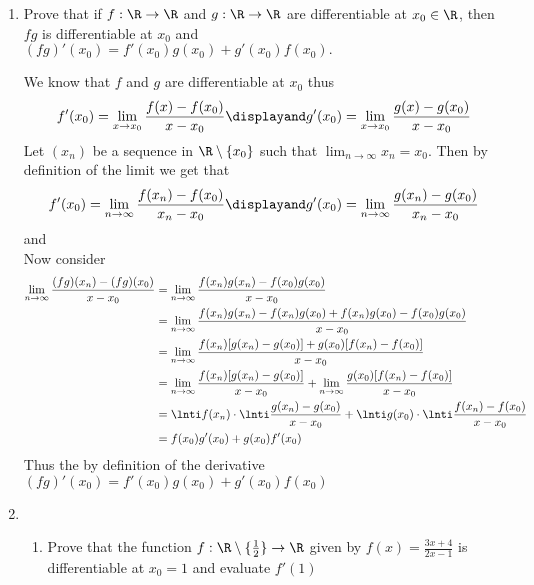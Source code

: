 \documentclass[11pt]{exam}
\begin{document}
    \begin{enumerate}
        \item Prove that if $f: \R \to \R$ and $g: \R \to \R$ are differentiable at $x_0 \in \R$, then 
        $fg$ is differentiable at $x_0$ and $(fg)'(x_0) = f'(x_0)g(x_0) + g'(x_0)f(x_0).$
            \begin{solution}
                We know that $f$ and $g$ are differentiable at $x_0$ thus 
                $$f'(x_0)  = \lim_{x \to x_0} \frac{f(x) - f(x_0)}{x - x_0} 
                \displayand g'(x_0)  = \lim_{x \to x_0} \frac{g(x) - g(x_0)}{x - x_0}$$
                Let $(x_n)$ be a sequence in $\R \setminus \{x_0\}$ such that $\lim_{n \to \infty} x_n = x_0$. Then by definition of the limit 
                we get that 
                $$f'(x_0) = \lim_{n \to \infty} \frac{f(x_n) - f(x_0)}{x_n - x_0} \displayand g'(x_0) = \lim_{n \to \infty} \frac{g(x_n) - g(x_0)}{x_n - x_0} $$ and 
                $$$$
                Now consider 
                \begin{align*}
                    \lim_{n \to \infty} \frac{(fg)(x_n) - (fg)(x_0)}{x - x_0} 
                    &= \lim_{n \to \infty} \frac{f(x_n)g(x_n) - f(x_0)g(x_0)}{x-x_0}  \\
                    &= \lim_{n \to \infty} \frac{f(x_n)g(x_n) - f(x_n)g(x_0) + f(x_n)g(x_0) -f(x_0)g(x_0)}{x-x_0} \\
                    &= \lim_{n \to \infty} \frac{f(x_n)[g(x_n) - g(x_0)] + g(x_0)[f(x_n) - f(x_0)]}{x-x_0} \\
                    &=  \lim_{n \to \infty} \frac{f(x_n)[g(x_n) - g(x_0)]}{x-x_0} + \lim_{n \to \infty} \frac{g(x_0)[f(x_n) - f(x_0)]}{x-x_0} \\
                    &= \lnti f(x_n) \cdot \lnti \frac{g(x_n) - g(x_0)}{x-x_0} + \lnti g(x_0) \cdot \lnti \frac{f(x_n) - f(x_0)}{x-x_0} \\
                    &= f(x_0)g'(x_0) + g(x_0)f'(x_0)
                \end{align*}
                Thus the by definition of the derivative $(fg)'(x_0) = f'(x_0)g(x_0) + g'
                (x_0)f(x_0)$
            \end{solution}
            \break
        \item 
            \begin{enumerate}
                \item Prove that the function $f: \R \setminus \{\frac{1}{2}\} \to \R$ given by $f(x) = \frac{3x+4}{2x-1}$ is differentiable at 
                $x_0 = 1$ and evaluate $f'(1)$

\end{enumerate}
\end{enumerate}
\end{document}
